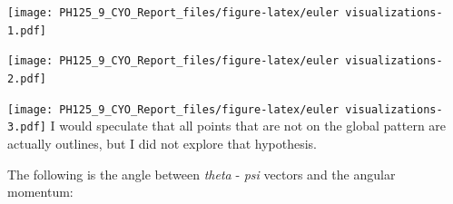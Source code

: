 \documentclass[]{article}
\newenvironment{Shaded}{\begin{snugshade}}{\end{snugshade}}
\newcommand{\DataTypeTok}[1]{\textcolor[rgb]{0.13,0.29,0.53}{#1}}
\newcommand{\DecValTok}[1]{\textcolor[rgb]{0.00,0.00,0.81}{#1}}
\newcommand{\KeywordTok}[1]{\textcolor[rgb]{0.13,0.29,0.53}{\textbf{#1}}}
\newcommand{\NormalTok}[1]{#1}
\newcommand{\OperatorTok}[1]{\textcolor[rgb]{0.81,0.36,0.00}{\textbf{#1}}}
\newcommand{\StringTok}[1]{\textcolor[rgb]{0.31,0.60,0.02}{#1}}
\begin{document}
\texttt{[image: PH125\_9\_CYO\_Report\_files/figure-latex/euler visualizations-1.pdf]}

\begin{Shaded}
\end{Shaded}

\texttt{[image: PH125\_9\_CYO\_Report\_files/figure-latex/euler visualizations-2.pdf]}

\begin{Shaded}
\end{Shaded}

\texttt{[image: PH125\_9\_CYO\_Report\_files/figure-latex/euler visualizations-3.pdf]}
I would speculate that all points that are not on the global pattern are
actually outlines, but I did not explore that hypothesis.

The following is the angle between \emph{theta} - \emph{psi} vectors and
the angular momentum:

\begin{Shaded}
\end{Shaded}
\end{document}
